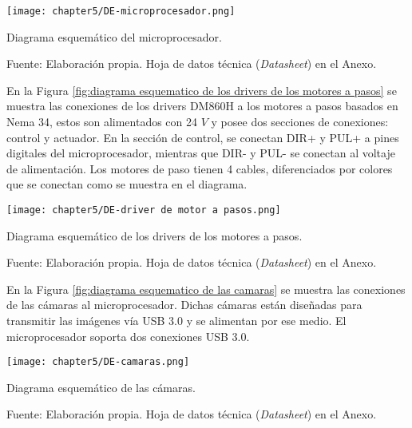 \begin{myfigure}[H]
	\footnotesize\centering
	\texttt{[image: chapter5/DE-microprocesador.png]}
	\caption{Diagrama esquemático del microprocesador.}
	\begin{myflushcenter}
		Fuente: Elaboración propia. Hoja de datos técnica (\textit{Datasheet}) en el Anexo.
	\end{myflushcenter}
	\label{fig:diagrama esquematico de conexiones al microprocesador}
\end{myfigure}

En la Figura \ref{fig:diagrama esquematico de los drivers de los motores a pasos} se muestra las conexiones de los drivers DM860H a los motores a pasos basados en Nema 34, estos son alimentados con 24 $V$ y posee dos secciones de conexiones: control y actuador. En la sección de control, se conectan DIR+ y PUL+ a pines digitales del microprocesador, mientras que DIR- y PUL- se conectan al voltaje de alimentación. Los motores de paso tienen 4 cables, diferenciados por colores que se conectan como se muestra en el diagrama.

\begin{myfigure}[H]
	\footnotesize\centering
	\texttt{[image: chapter5/DE-driver de motor a pasos.png]}
	\caption{Diagrama esquemático de los drivers de los motores a pasos.}
	\begin{myflushcenter}
		Fuente: Elaboración propia. Hoja de datos técnica (\textit{Datasheet}) en el Anexo.
	\end{myflushcenter}
	\label{fig:diagrama esquematico de los drivers de los motores a pasos}
\end{myfigure}

En la Figura \ref{fig:diagrama esquematico de las camaras} se muestra las conexiones de las cámaras al microprocesador. Dichas cámaras están diseñadas para transmitir las imágenes vía USB 3.0 y se alimentan por ese medio. El microprocesador soporta dos conexiones USB 3.0.

\begin{myfigure}[H]
	\footnotesize\centering
	\texttt{[image: chapter5/DE-camaras.png]}
	\caption{Diagrama esquemático de las cámaras.}
	\begin{myflushcenter}
		Fuente: Elaboración propia. Hoja de datos técnica (\textit{Datasheet}) en el Anexo.
	\end{myflushcenter}
	\label{fig:diagrama esquematico de las camaras}
\end{myfigure}

